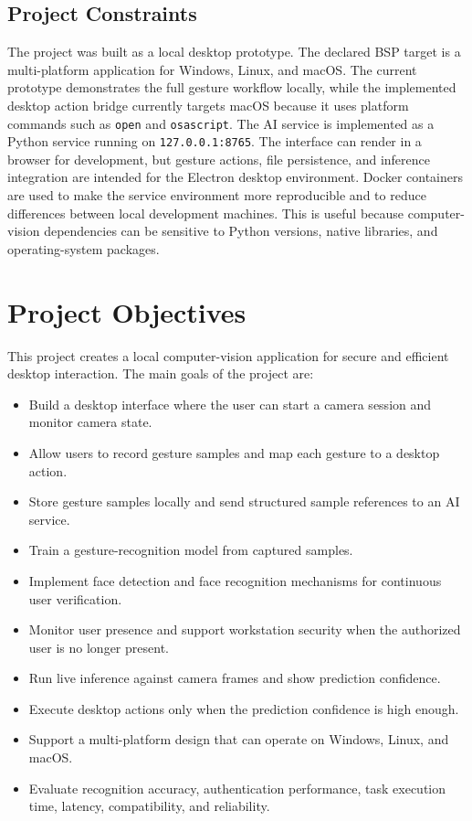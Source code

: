 \documentclass[10pt,twocolumn]{article}
\begin{document}
\subsection{Project Constraints}
The project was built as a local desktop prototype.
The declared BSP target is a multi-platform application for Windows, Linux, and macOS.
The current prototype demonstrates the full gesture workflow locally, while the implemented desktop action bridge currently targets macOS because it uses platform commands such as \texttt{open} and \texttt{osascript}.
The AI service is implemented as a Python service running on \texttt{127.0.0.1:8765}.
The interface can render in a browser for development, but gesture actions, file persistence, and inference integration are intended for the Electron desktop environment.
Docker containers are used to make the service environment more reproducible and to reduce differences between local development machines.
This is useful because computer-vision dependencies can be sensitive to Python versions, native libraries, and operating-system packages.

\section{Project Objectives}
This project creates a local computer-vision application for secure and efficient desktop interaction.
The main goals of the project are:

\begin{itemize}[leftmargin=*]
  \item Build a desktop interface where the user can start a camera session and monitor camera state.
  \item Allow users to record gesture samples and map each gesture to a desktop action.
  \item Store gesture samples locally and send structured sample references to an AI service.
  \item Train a gesture-recognition model from captured samples.
  \item Implement face detection and face recognition mechanisms for continuous user verification.
  \item Monitor user presence and support workstation security when the authorized user is no longer present.
  \item Run live inference against camera frames and show prediction confidence.
  \item Execute desktop actions only when the prediction confidence is high enough.
  \item Support a multi-platform design that can operate on Windows, Linux, and macOS.
  \item Evaluate recognition accuracy, authentication performance, task execution time, latency, compatibility, and reliability.
\end{itemize}
\end{document}

